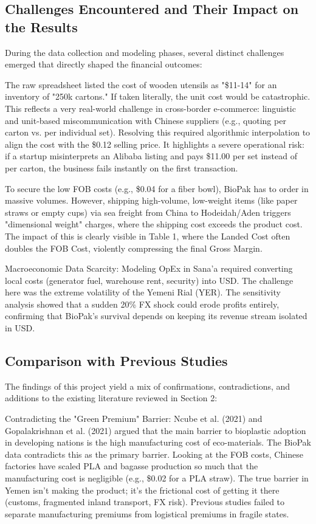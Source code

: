 \documentclass[12pt,a4paper]{article}
\begin{document}
\subsection{Challenges Encountered and Their Impact on the Results}

During the data collection and modeling phases, several distinct challenges emerged that directly shaped the financial outcomes:

The raw spreadsheet listed the cost of wooden utensils as "\$11-14" for an inventory of "250k cartons." If taken literally, the unit cost would be catastrophic. This reflects a very real-world challenge in cross-border e-commerce: linguistic and unit-based miscommunication with Chinese suppliers (e.g., quoting per carton vs. per individual set). Resolving this required algorithmic interpolation to align the cost with the \$0.12 selling price. It highlights a severe operational risk: if a startup misinterprets an Alibaba listing and pays \$11.00 per set instead of per carton, the business fails instantly on the first transaction.

To secure the low FOB costs (e.g., \$0.04 for a fiber bowl), BioPak has to order in massive volumes. However, shipping high-volume, low-weight items (like paper straws or empty cups) via sea freight from China to Hodeidah/Aden triggers "dimensional weight" charges, where the shipping cost exceeds the product cost. The impact of this is clearly visible in Table 1, where the Landed Cost often doubles the FOB Cost, violently compressing the final Gross Margin.

Macroeconomic Data Scarcity: Modeling OpEx in Sana'a required converting local costs (generator fuel, warehouse rent, security) into USD. The challenge here was the extreme volatility of the Yemeni Rial (YER). The sensitivity analysis showed that a sudden 20\% FX shock could erode profits entirely, confirming that BioPak's survival depends on keeping its revenue stream isolated in USD.

\subsection{Comparison with Previous Studies}

The findings of this project yield a mix of confirmations, contradictions, and additions to the existing literature reviewed in Section 2:

Contradicting the "Green Premium" Barrier: Ncube et al. (2021) and Gopalakrishnan et al. (2021) argued that the main barrier to bioplastic adoption in developing nations is the high manufacturing cost of eco-materials. The BioPak data contradicts this as the primary barrier. Looking at the FOB costs, Chinese factories have scaled PLA and bagasse production so much that the manufacturing cost is negligible (e.g., \$0.02 for a PLA straw). The true barrier in Yemen isn't making the product; it's the frictional cost of getting it there (customs, fragmented inland transport, FX risk). Previous studies failed to separate manufacturing premiums from logistical premiums in fragile states.
\end{document}
